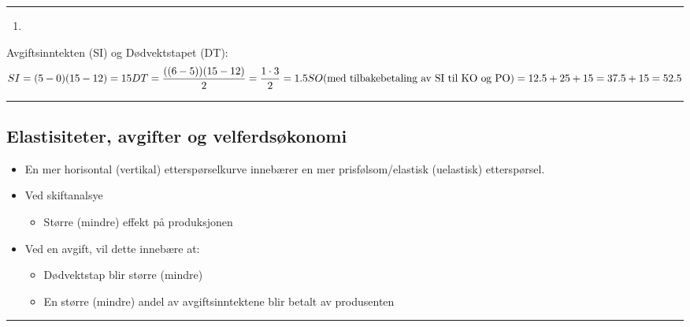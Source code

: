 \documentclass[
  letterpaper,
  DIV=11,
  numbers=noendperiod]{scrartcl}
\providecommand{\tightlist}{%
  \setlength{\itemsep}{0pt}\setlength{\parskip}{0pt}}\usepackage{longtable,booktabs,array}
\begin{document}
\begin{center}\rule{0.5\linewidth}{0.5pt}\end{center}

\begin{enumerate}
\def\labelenumi{\alph{enumi})}
\setcounter{enumi}{4}
\tightlist
\item
\end{enumerate}

Avgiftsinntekten (SI) og Dødvektstapet (DT): \begin{equation*}
SI = (5-0)(15-12)= 15 \\
DT =\frac{((6-5))(15-12)}{2} = \frac{1 \cdot 3}{2} = 1.5 \\
SO (\text{med tilbakebetaling av SI til KO og PO})= 12.5+25 + 15 =  37.5 + 15 = 52.5
\end{equation*}

\begin{center}\rule{0.5\linewidth}{0.5pt}\end{center}

\subsection{Elastisiteter, avgifter og
velferdsøkonomi}\label{elastisiteter-avgifter-og-velferdsuxf8konomi}

\begin{itemize}
\tightlist
\item
  En mer horisontal (vertikal) etterspørselkurve innebærer en mer
  prisfølsom/elastisk (uelastisk) etterspørsel.
\item
  Ved skiftanalsye

  \begin{itemize}
  \tightlist
  \item
    Større (mindre) effekt på produksjonen
  \end{itemize}
\item
  Ved en avgift, vil dette innebære at:

  \begin{itemize}
  \tightlist
  \item
    Dødvektstap blir større (mindre)
  \item
    En større (mindre) andel av avgiftsinntektene blir betalt av
    produsenten
  \end{itemize}
\end{itemize}

\begin{center}\rule{0.5\linewidth}{0.5pt}\end{center}
\end{document}
